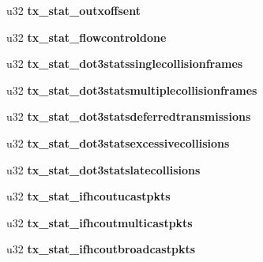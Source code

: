 \begin{DoxyCompactItemize}
\item 
\hypertarget{structemac__stats_afae6342487c27fc7f0ff78ec09b039f9}{
u32 {\bfseries tx\_\-stat\_\-outxoffsent}}
\label{structemac__stats_afae6342487c27fc7f0ff78ec09b039f9}

\item 
\hypertarget{structemac__stats_a29f34b5c3060acee3a5dd1250b34a6e5}{
u32 {\bfseries tx\_\-stat\_\-flowcontroldone}}
\label{structemac__stats_a29f34b5c3060acee3a5dd1250b34a6e5}

\item 
\hypertarget{structemac__stats_aa76f96fa2e74fa0dc006e1e93e7b2f69}{
u32 {\bfseries tx\_\-stat\_\-dot3statssinglecollisionframes}}
\label{structemac__stats_aa76f96fa2e74fa0dc006e1e93e7b2f69}

\item 
\hypertarget{structemac__stats_a117dc7c699224238005804c9b339ff60}{
u32 {\bfseries tx\_\-stat\_\-dot3statsmultiplecollisionframes}}
\label{structemac__stats_a117dc7c699224238005804c9b339ff60}

\item 
\hypertarget{structemac__stats_a6fbe171a46a586d1c50ef3a4662dbb33}{
u32 {\bfseries tx\_\-stat\_\-dot3statsdeferredtransmissions}}
\label{structemac__stats_a6fbe171a46a586d1c50ef3a4662dbb33}

\item 
\hypertarget{structemac__stats_aa689dd9042bb61e692a7c3cb82ba14d1}{
u32 {\bfseries tx\_\-stat\_\-dot3statsexcessivecollisions}}
\label{structemac__stats_aa689dd9042bb61e692a7c3cb82ba14d1}

\item 
\hypertarget{structemac__stats_a04e28280b6ba508c49eb8a654a40e83d}{
u32 {\bfseries tx\_\-stat\_\-dot3statslatecollisions}}
\label{structemac__stats_a04e28280b6ba508c49eb8a654a40e83d}

\item 
\hypertarget{structemac__stats_af723329dd0acd1ec26af913de1725323}{
u32 {\bfseries tx\_\-stat\_\-ifhcoutucastpkts}}
\label{structemac__stats_af723329dd0acd1ec26af913de1725323}

\item 
\hypertarget{structemac__stats_a5864580ef822776624f24fac655018fd}{
u32 {\bfseries tx\_\-stat\_\-ifhcoutmulticastpkts}}
\label{structemac__stats_a5864580ef822776624f24fac655018fd}

\item 
\hypertarget{structemac__stats_a93fe1f0d45a7e517407b7ff0fe3be7a3}{
u32 {\bfseries tx\_\-stat\_\-ifhcoutbroadcastpkts}}
\label{structemac__stats_a93fe1f0d45a7e517407b7ff0fe3be7a3}


\end{DoxyCompactItemize}
